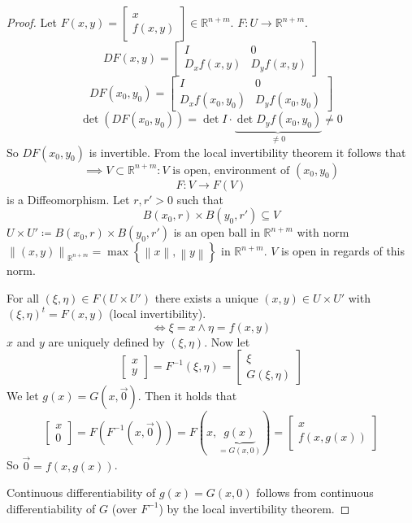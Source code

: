 \documentclass[a4paper,landscape,twocolumn]{article}
\theoremstyle{definition}
\newcommand\set[1]{\left\{#1\right\}}
\newcommand\norm[1]{\left\|#1\right\|}
\begin{document}
\begin{proof}
  Let $F(x,y) = \begin{bmatrix} x \\ f(x,y) \end{bmatrix} \in \mathbb R^{n + m}$. $F: U \to \mathbb R^{n + m}$.
  \[
    DF(x,y) = \begin{bmatrix}
      I & 0 \\
      D_x f(x,y) & D_y f(x,y)
    \end{bmatrix}
  \] \[
    DF(x_0, y_0) = \begin{bmatrix}
      I  & 0 \\
      D_x f(x_0, y_0) & D_y f(x_0, y_0)
    \end{bmatrix}
  \] \[
    \det(DF(x_0, y_0))
      = \det{I} \cdot \underbrace{\det{D_y f(x_0, y_0)}}_{\neq 0} \neq 0
  \]
  So $DF(x_0, y_0)$ is invertible.
  From the local invertibility theorem it follows that
  \[ \implies V \subset \mathbb R^{n+m}: V \text{ is open, environment of } (x_0, y_0) \]
  \[ F: V \to F(V) \]
  is a Diffeomorphism. Let $r, r' > 0$ such that
  \[ B(x_0, r) \times B(y_0, r') \subseteq V \]
  $U \times U' \coloneqq B(x_0, r) \times B(y_0, r')$ is an open ball in $\mathbb R^{n+m}$ with norm
  $\norm{(x,y)}_{\mathbb R^{n+m}} = \max\set{\norm{x}, \norm{y}}$ in $\mathbb R^{n+m}$.
  $V$ is open in regards of this norm.

  For all $(\xi, \eta) \in F(U \times U')$ there exists a unique $(x,y) \in U \times U'$
  with $(\xi, \eta)^t = F(x,y)$ (local invertibility).
  \[ \iff \xi = x \land \eta = f(x, y) \]
  $x$ and $y$ are uniquely defined by $(\xi, \eta)$.
  Now let
  \[
  \begin{bmatrix} x \\ y \end{bmatrix}
  = F^{-1}(\xi, \eta)
  = \begin{bmatrix}
    \xi \\ G(\xi, \eta)
  \end{bmatrix}
  \]
  We let $g(x) = G(x, \vec{0})$.
  Then it holds that
  \[
    \begin{bmatrix} x \\ 0 \end{bmatrix}
    = F(F^{-1}(x, \vec{0}))
    = F(x, \underbrace{g(x)}_{=G(x,0)})
    = \begin{bmatrix} x \\ f(x, g(x)) \end{bmatrix}
  \]
  So $\vec{0} = f(x, g(x))$.

  Continuous differentiability of $g(x) = G(x, 0)$
  follows from continuous differentiability of $G$
  (over $F^{-1}$) by the local invertibility theorem.
\end{proof}
\end{document}
